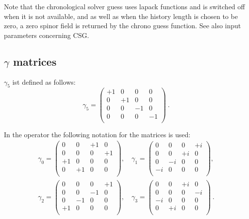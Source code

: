Note that the chronological solver guess uses lapack functions and is
switched off when it is not available, and as well as when the history
length is chosen to be zero, a zero spinor field is returned by the
chrono guess function. See also input parameters concerning CSG.

\subsection{$\gamma$ matrices}

$\gamma_5$ ist defined as follows:
\[
  \gamma_5 =
  \begin{pmatrix}
    +1 & 0 & 0 & 0 \\
    0 & +1 & 0 & 0 \\
    0 & 0 & -1 & 0 \\
    0 & 0 & 0 & -1 \\    
  \end{pmatrix}\ .
\]

In the operator the following notation for
the matrices is used:
\[
\begin{split}
  \gamma_0 = \begin{pmatrix}
    0 & 0 & +1 & 0 \\
    0 & 0 & 0 & +1 \\
    +1 & 0 & 0 & 0 \\
    0 & +1 & 0 & 0 \\
  \end{pmatrix},\quad
  \gamma_1 =\begin{pmatrix}
    0 & 0 & 0 & +i \\
    0 & 0 & +i & 0 \\
    0 & -i & 0 & 0 \\
    -i & 0 & 0 & 0 \\    
  \end{pmatrix},\\
  \gamma_2 = \begin{pmatrix}
    0 & 0 & 0 & +1 \\
    0 & 0 & -1 & 0 \\
    0 & -1 & 0 & 0 \\
    +1 & 0 & 0 & 0 \\   
  \end{pmatrix},\quad
  \gamma_3 =\begin{pmatrix}
    0 & 0 & +i & 0 \\
    0 & 0 & 0 & -i \\
    -i & 0 & 0 & 0 \\
    0 & +i & 0 & 0 \\
  \end{pmatrix}\ .\\
\end{split}
\]



